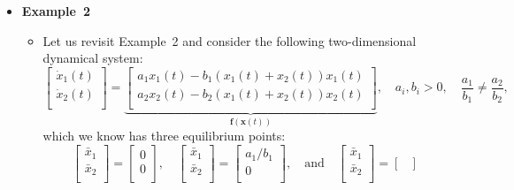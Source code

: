 \documentclass[12pt,a4paper]{article}
\begin{document}
\begin{itemize}
\item \textbf{Example~2}
  \begin{itemize}
  \item Let us revisit Example~2 and consider the following two-dimensional dynamical system:
    \begin{equation}\nonumber%
      \begin{bmatrix}
        \dot{x}_{1}(t) \\
        \dot{x}_{2}(t) \\
      \end{bmatrix}
      =
      \underbrace{
      \begin{bmatrix}
      a_{1}x_{1}(t) - b_{1}(x_{1}(t)+x_{2}(t))x_{1}(t) \\
      a_{2}x_{2}(t) - b_{2}(x_{1}(t)+x_{2}(t))x_{2}(t) \\
      \end{bmatrix}}_{\bm{f}(\bm{x}(t))},
      \quad
      a_{i}, b_{i}>0,
      \quad
      \frac{a_{1}}{b_{1}} \neq \frac{a_{2}}{b_{2}},
    \end{equation}
    which we know has three equilibrium points:
    \begin{equation}\nonumber%
      \begin{bmatrix}
        \bar{x}_{1} \\
        \bar{x}_{2} \\
      \end{bmatrix}
      =
      \begin{bmatrix}
        0 \\
        0 \\
      \end{bmatrix},
      \quad
        \begin{bmatrix}
          \bar{x}_{1} \\
          \bar{x}_{2} \\
        \end{bmatrix}
        = 
        \begin{bmatrix}
          a_{1}/b_{1} \\
          0 \\
        \end{bmatrix},
        \quad\text{and}\quad
        \begin{bmatrix}
          \bar{x}_{1} \\
          \bar{x}_{2} \\
        \end{bmatrix}
        = 
        \begin{bmatrix}

\end{bmatrix}
\end{equation}
\end{itemize}
\end{itemize}
\end{document}
